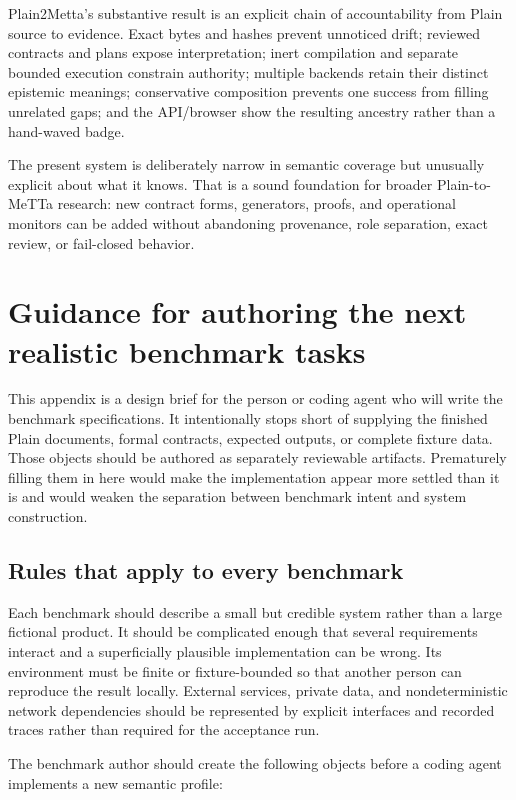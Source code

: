 \documentclass[11pt]{article}
\begin{document}
Plain2Metta's substantive result is an explicit chain of accountability from
Plain source to evidence.  Exact bytes and hashes prevent unnoticed drift;
reviewed contracts and plans expose interpretation; inert compilation and
separate bounded execution constrain authority; multiple backends retain
their distinct epistemic meanings; conservative composition prevents one
success from filling unrelated gaps; and the API/browser show the resulting
ancestry rather than a hand-waved badge.

The present system is deliberately narrow in semantic coverage but unusually
explicit about what it knows.  That is a sound foundation for broader
Plain-to-MeTTa research: new contract forms, generators, proofs, and operational
monitors can be added without abandoning provenance, role separation, exact
review, or fail-closed behavior.

\appendix

\section{Guidance for authoring the next realistic benchmark tasks}

This appendix is a design brief for the person or coding agent who will write
the benchmark specifications.  It intentionally stops short of supplying the
finished Plain documents, formal contracts, expected outputs, or complete
fixture data.  Those objects should be authored as separately reviewable
artifacts.  Prematurely filling them in here would make the implementation
appear more settled than it is and would weaken the separation between
benchmark intent and system construction.

\subsection{Rules that apply to every benchmark}

Each benchmark should describe a small but credible system rather than a
large fictional product.  It should be complicated enough that several
requirements interact and a superficially plausible implementation can be
wrong.  Its environment must be finite or fixture-bounded so that another
person can reproduce the result locally.  External services, private data,
and nondeterministic network dependencies should be represented by explicit
interfaces and recorded traces rather than required for the acceptance run.

The benchmark author should create the following objects before a coding
agent implements a new semantic profile:
\end{document}
